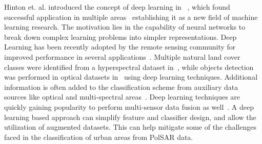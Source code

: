 Hinton et. al. introduced the concept of deep learning in ~\cite{hinton2006fast}, which  found successful application in multiple areas~\cite{he2015delving, deng2013recent, glorot2011domain, mnih2013playing} establishing it as a new field of machine learning research. 
The motivation lies in the capability of neural networks to break down complex learning problems into simpler representations. Deep Learning has been recently adopted by the remote sensing community for improved performance in several applications~\cite{han2015object,tang2015compressed,chen2014vehicle}. Multiple natural land cover classes were identified from a hyperspectral dataset in~\cite{chen2014deep}, while objects detection was performed in optical datasets in~\cite{han2015object} using deep learning techniques. Additional information is often added to the classification scheme from auxiliary data sources like optical and multi-spectral areas~\cite{zhu2012assessment,6202721}. Deep learning techniques are quickly gaining popularity to perform multi-sensor data fusion as well~\cite{zhang2015deep,li2008remote}. A deep learning based approach can simplify feature and classifier design, and allow the utilization of augmented datasets. This can help mitigate some of the challenges faced in the classification of urban areas from PolSAR data.  





 
